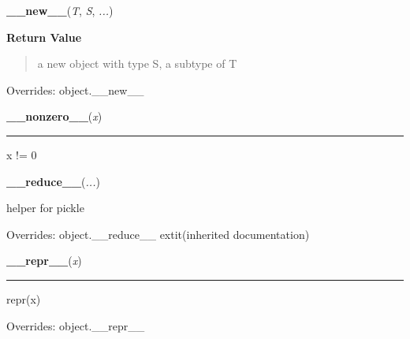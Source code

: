 \hspace{.8\funcindent}\begin{boxedminipage}{\funcwidth}

    \raggedright \textbf{\_\_new\_\_}(\textit{T}, \textit{S}, \textit{...})

\setlength{\parskip}{2ex}
\setlength{\parskip}{1ex}
      \textbf{Return Value}
    \vspace{-1ex}

      \begin{quote}
      a new object with type S, a subtype of T

      \end{quote}

      Overrides: object.\_\_new\_\_

    \end{boxedminipage}

    \label{pygame:Rect:__nonzero__}

    \vspace{0.5ex}

\hspace{.8\funcindent}\begin{boxedminipage}{\funcwidth}

    \raggedright \textbf{\_\_nonzero\_\_}(\textit{x})

    \vspace{-1.5ex}

    \rule{\textwidth}{0.5\fboxrule}
\setlength{\parskip}{2ex}
    x != 0

\setlength{\parskip}{1ex}
    \end{boxedminipage}

    \vspace{0.5ex}

\hspace{.8\funcindent}\begin{boxedminipage}{\funcwidth}

    \raggedright \textbf{\_\_reduce\_\_}(\textit{...})

\setlength{\parskip}{2ex}
    helper for pickle

\setlength{\parskip}{1ex}
      Overrides: object.\_\_reduce\_\_ 	extit{(inherited documentation)}

    \end{boxedminipage}

    \vspace{0.5ex}

\hspace{.8\funcindent}\begin{boxedminipage}{\funcwidth}

    \raggedright \textbf{\_\_repr\_\_}(\textit{x})

    \vspace{-1.5ex}

    \rule{\textwidth}{0.5\fboxrule}
\setlength{\parskip}{2ex}
    repr(x)

\setlength{\parskip}{1ex}
      Overrides: object.\_\_repr\_\_

    \end{boxedminipage}

